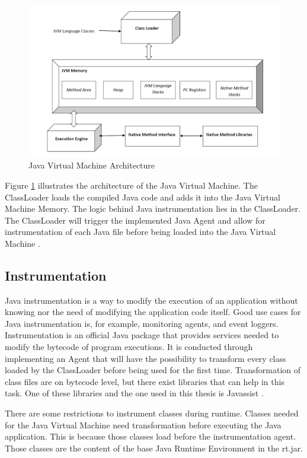 \begin{figure}[H]
    \centering
    \includegraphics[width=\textwidth]{images/JvmSpec7.png}
    \caption{Java Virtual Machine Architecture}
    \label{fig:JVM}
\end{figure}

Figure \ref{fig:JVM} illustrates the architecture of the Java Virtual Machine. The ClassLoader loads the compiled Java code and adds it into the Java Virtual Machine Memory. The logic behind Java instrumentation lies in the ClassLoader. The ClassLoader will trigger the implemented Java Agent and allow for instrumentation of each Java file before being loaded into the Java Virtual Machine \parencite{venners_1999, instru}.



\subsection{Instrumentation}
Java instrumentation is a way to modify the execution of an application without knowing nor the need of modifying the application code itself. Good use cases for Java instrumentation is, for example, monitoring agents, and event loggers. Instrumentation is an official Java package that provides services needed to modify the bytecode of program executions. It is conducted through implementing an Agent that will have the possibility to transform every class loaded by the ClassLoader before being used for the first time. Transformation of class files are on bytecode level, but there exist libraries that can help in this task. One of these libraries and the one used in this thesis is Javassist \parencite{Java_Instrument, Javassist}.

There are some restrictions to instrument classes during runtime. Classes needed for the Java Virtual Machine need transformation before executing the Java application. This is because those classes load before the instrumentation agent. Those classes are the content of the base Java Runtime Environment in the rt.jar.



